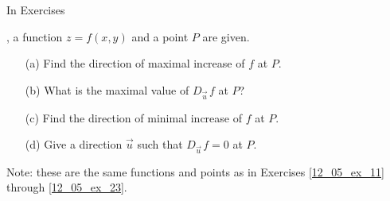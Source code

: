 {\noindent In Exercises}
{, a function $z=f(x,y)$ and a point $P$ are given. 
\begin{enumerate}
	\item [(a)] Find the direction of maximal increase of $f$ at $P$.
	\item [(b)] What is the maximal value of $D_{\vec u\,}f$ at $P$?
	\item [(c)] Find the direction of minimal increase of $f$ at $P$.
	\item	[(d)] Give a direction $\vec u$ such that $D_{\vec u\,}f=0$ at $P$.
\end{enumerate}
Note: these are the same functions and points as in Exercises \ref{12_05_ex_11} through \ref{12_05_ex_23}.
}

